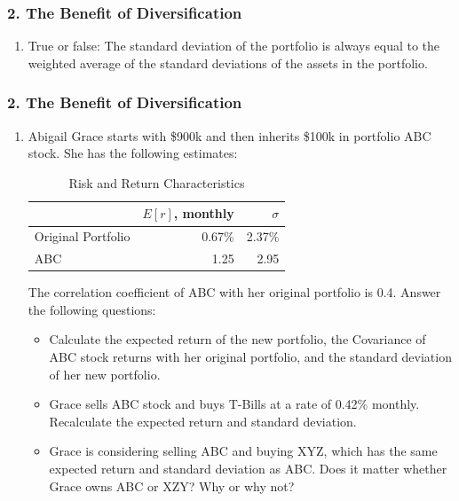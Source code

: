 \documentclass{beamer}
\begin{document}
\begin{practiceframe}
    \frametitle{2. The Benefit of Diversification}
    
    \begin{enumerate}[2]
        \item True or false: The standard deviation of the portfolio is always equal to the weighted average of the standard deviations of the assets in the portfolio.
    \end{enumerate}
    
\end{practiceframe}

\begin{practiceframe}[t]
    \frametitle{2. The Benefit of Diversification}

    \vspace{-1em}
    \footnotesize{
        \begin{enumerate}[1]
        \item Abigail Grace starts with \$900k and then inherits \$100k in 
        portfolio ABC stock.   She has the following estimates:
              \begin{table}
                \caption{Risk and Return Characteristics}
                \begin{tabular}{lrr}
                \toprule
                    & $E[r]$, monthly & $\sigma$\\
                \midrule
                    Original Portfolio & 0.67\% & 2.37\%\\
                ABC & 1.25 & 2.95\\
                \bottomrule
                \end{tabular}
                \end{table}
       The correlation coefficient of ABC with her original portfolio is 0.4.  Answer the following questions:
        \begin{itemize}
            \item Calculate the expected return of the new portfolio, the Covariance of ABC stock returns with her original portfolio, and the standard deviation of her new portfolio.
            \item Grace sells ABC stock and buys T-Bills at a rate of 0.42\% monthly.   Recalculate the expected return and standard deviation.
            \item Grace is considering selling ABC and buying XYZ, which has the same  
            expected return and standard deviation as ABC.   Does it matter whether Grace owns ABC 
            or XZY?   Why or why not?
        \end{itemize}
    \end{enumerate}
    }
\end{practiceframe}
\end{document}
